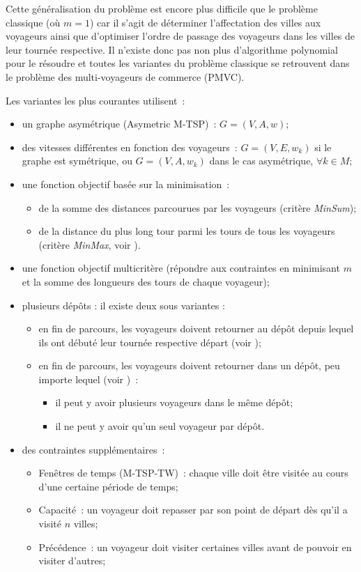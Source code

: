 Cette généralisation du problème est encore plus difficile que le problème classique (où $m=1$) car il s'agit de déterminer l'affectation des villes aux voyageurs ainsi que d'optimiser l'ordre de passage des voyageurs dans les villes de leur tournée respective. Il n'existe donc pas non plus d'algorithme polynomial pour le résoudre et toutes les variantes du problème classique se retrouvent dans le problème des multi-voyageurs de commerce (PMVC).

Les variantes les plus courantes utilisent~: 
\begin{itemize}
 \item un graphe asymétrique (Asymetric M-TSP)~: $G = (V,A,w)$;
 \item des vitesses différentes en fonction des voyageurs~: $G = (V,E,w_k)$ si le graphe est symétrique, ou $G = (V,A,w_k)$ dans le cas asymétrique, $\forall k \in M$;
 \item une fonction objectif basée sur la minimisation~:
  \begin{itemize}
    \item de la somme des distances parcourues par les voyageurs (critère \textit{\mbox{MinSum}}); %
    \item de la distance du plus long tour parmi les tours de tous les voyageurs (critère \textit{\mbox{MinMax}}, voir \cite{Franca1995}). %
  \end{itemize}
 \item une fonction objectif multicritère (répondre aux contraintes en minimisant $m$ et la somme des longueurs des tours de chaque voyageur);
 \item plusieurs dépôts : il existe deux sous variantes : 
 \begin{itemize}
  \item en fin de parcours, les voyageurs doivent retourner au dépôt depuis lequel ils ont débuté leur tournée respective départ (voir \cite{Laporte1988});
  \item en fin de parcours, les voyageurs doivent retourner dans un dépôt, peu importe lequel (voir \cite{YangGuoXing1995})~:
    \begin{itemize}
      \item il peut y avoir plusieurs voyageurs dans le même dépôt;
      \item il ne peut y avoir qu'un seul voyageur par dépôt.
    \end{itemize}
  \end{itemize}
 \item des contraintes supplémentaires~: 
 \begin{itemize}
  \item Fenêtres de temps (M-TSP-TW)~: chaque ville doit être visitée au cours d'une certaine période de temps;
  \item Capacité~: un voyageur doit repasser par son point de départ dès qu'il a visité $n$ villes;
  \item Précédence~: un voyageur doit visiter certaines villes avant de pouvoir en visiter d'autres;\\
 \end{itemize}
\end{itemize}

